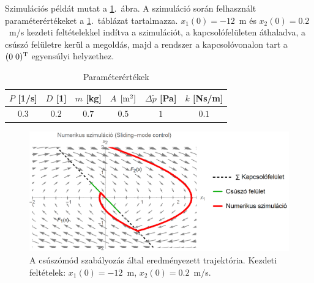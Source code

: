 Szimulációs példát mutat a \ref{fig:sliding_mode_control}.~ábra. A szimuláció során felhasznált paraméterértékeket a \ref{table:parameter}.~táblázat tartalmazza. $x_1(0) = -12$~m és $x_2(0) = 0.2$~m/s kezdeti feltételekkel indítva a szimulációt, a kapcsolófelületen áthaladva, a csúszó felületre kerül a megoldás, majd a rendszer a kapcsolóvonalon tart a $(0 \; 0)^{\rm T}$ egyensúlyi helyzethez.
%
\begin{table}[h!]
	\caption{Paraméterértékek} 
	\vspace{0.1 cm}
	\centering
	\begin{tabular}{|c|c|c|c|c|c|} \hline
	$P$ [1/s] & $D$ [1] & $m$ [kg] & $A$ $[{\rm m}^2]$ & $\Delta \tilde{p}$ [Pa] & $k$ [Ns/m] \\ 	\hline
	$0.3$ & $0.2$ & $0.7$ & $0.5$ & $1$ & $0.1$ \\ \hline
	\end{tabular}
	\label{table:parameter}
\end{table}
%
\begin{figure}[ht]
\centering
\includegraphics[width=\textwidth]{graphics/sliding_mode_control.png}
\caption{A csúszómód szabályozás által eredményezett trajektória. Kezdeti feltételek: $x_1(0) = -12$~m, $x_2(0) = 0.2$~m/s.}
\label{fig:sliding_mode_control}
\end{figure}

\clearpage